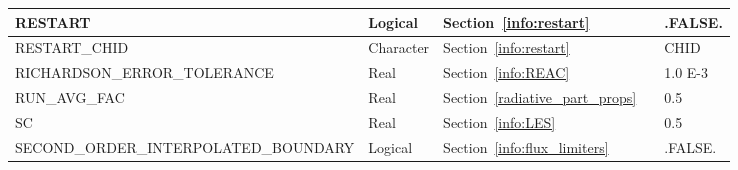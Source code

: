 \documentclass[11pt]{book}
\begin{document}
\begin{longtable}{@{\extracolsep{\fill}}|l|l|l|l|l|}
{\ct RESTART}                                   & Logical       & Section~\ref{info:restart}                            &               & {\ct .FALSE.}     \\ \hline
{\ct RESTART\_CHID}                             & Character     & Section~\ref{info:restart}                            &               & {\ct CHID}        \\ \hline
{\ct RICHARDSON\_ERROR\_TOLERANCE}              & Real          & Section~\ref{info:REAC}                               &               & 1.0 E-3           \\ \hline
{\ct RUN\_AVG\_FAC}                             & Real          & Section~\ref{radiative_part_props}                    &               & 0.5               \\ \hline
{\ct SC}                                        & Real          & Section~\ref{info:LES}                                &               & 0.5               \\ \hline
{\ct SECOND\_ORDER\_INTERPOLATED\_BOUNDARY}     & Logical       & Section~\ref{info:flux_limiters}                      &               & {\ct .FALSE.}     \\ \hline

\end{longtable}
\end{document}
